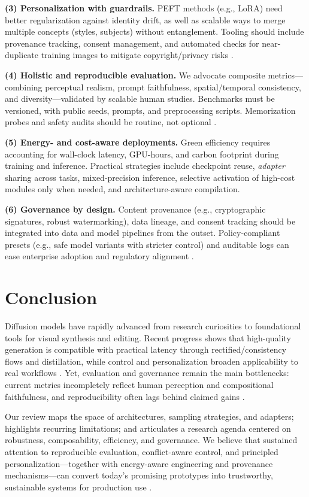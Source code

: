 \documentclass[conference]{IEEEtran}
\begin{document}
\textbf{(3) Personalization with guardrails.}
PEFT methods (e.g., LoRA) need better regularization against identity drift, as well as scalable ways to merge multiple concepts (styles, subjects) without entanglement. Tooling should include provenance tracking, consent management, and automated checks for near-duplicate training images to mitigate copyright/privacy risks \cite{Smith2024LoRADiffusion,Simsar2025LoRACLR}. 

\textbf{(4) Holistic and reproducible evaluation.}
We advocate composite metrics---combining perceptual realism, prompt faithfulness, spatial/temporal consistency, and diversity---validated by scalable human studies. Benchmarks must be versioned, with public seeds, prompts, and preprocessing scripts. Memorization probes and safety audits should be routine, not optional \cite{Stein2023EvaluationFlaws,Chen2025ComprehensiveSurvey}. 

\textbf{(5) Energy- and cost-aware deployments.}
Green efficiency requires accounting for wall-clock latency, GPU-hours, and carbon footprint during training and inference. Practical strategies include checkpoint reuse, \emph{adapter} sharing across tasks, mixed-precision inference, selective activation of high-cost modules only when needed, and architecture-aware compilation. 

\textbf{(6) Governance by design.}
Content provenance (e.g., cryptographic signatures, robust watermarking), data lineage, and consent tracking should be integrated into data and model pipelines from the outset. Policy-compliant presets (e.g., safe model variants with stricter control) and auditable logs can ease enterprise adoption and regulatory alignment \cite{Chen2025ComprehensiveSurvey}.
\section{Conclusion}\label{sec:conclusion}
Diffusion models have rapidly advanced from research curiosities to foundational tools for visual synthesis and editing. Recent progress shows that high-quality generation is compatible with practical latency through rectified/consistency flows and distillation, while control and personalization broaden applicability to real workflows \cite{Lee2024RectifiedArxiv,Zhang2023ControlNet,Zhao2023UniControlNet,Smith2024LoRADiffusion}. Yet, evaluation and governance remain the main bottlenecks: current metrics incompletely reflect human perception and compositional faithfulness, and reproducibility often lags behind claimed gains \cite{Stein2023EvaluationFlaws}. 

Our review maps the space of architectures, sampling strategies, and adapters; highlights recurring limitations; and articulates a research agenda centered on robustness, composability, efficiency, and governance. We believe that sustained attention to reproducible evaluation, conflict-aware control, and principled personalization---together with energy-aware engineering and provenance mechanisms---can convert today’s promising prototypes into trustworthy, sustainable systems for production use \cite{Chen2025ComprehensiveSurvey}.



\end{document}
